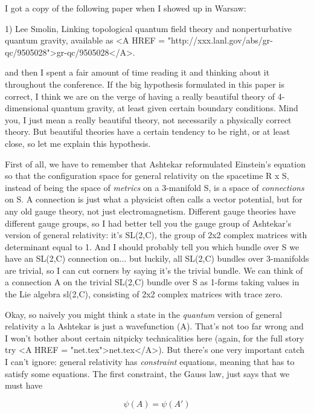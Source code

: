

I got a copy of the following paper when I showed up in Warsaw:

1) Lee Smolin, Linking topological quantum field theory and 
nonperturbative quantum gravity, available as <A HREF = "http://xxx.lanl.gov/abs/gr-qc/9505028">gr-qc/9505028</A>.

and then I spent a fair amount of time reading it and thinking
about it throughout the conference.  If the big hypothesis formulated in
this paper is correct, I think we are on the verge of having a
really beautiful theory of 4-dimensional quantum gravity, at
least given certain boundary conditions.  Mind you, I just
mean a really beautiful theory, not necessarily a physically
correct theory.  But beautiful theories have a certain tendency
to be right, or at least close, so let me explain this hypothesis. 

First of all, we have to remember that Ashtekar reformulated
Einstein's equation so that the configuration space for general 
relativity on the spacetime R x S, instead of being the space
of \emph{metrics} on a 3-manifold S, is a space of \emph{connections} on S.  
A connection is just what a physicist often calls a vector potential, but
for any old gauge theory, not just electromagnetism.  Different gauge
theories have different gauge groups, so I had better tell you the
gauge group of Ashtekar's version of general relativity: it's SL(2,C), 
the group of 2x2 complex matrices with determinant equal to 1. 
And I should probably tell you which bundle over S we have an SL(2,C)
connection on... but luckily, all SL(2,C) bundles over 3-manifolds
are trivial, so I can cut corners by saying it's the trivial bundle. 
We can think of a connection A
on the trivial SL(2,C) bundle over S as 1-forms taking values in
the Lie algebra sl(2,C), consisting of 2x2 complex matrices with
trace zero.

Okay, so naively you might think a state in the \emph{quantum} version
of general relativity a la Ashtekar is just a wavefunction \psi (A).
That's not too far wrong and I won't bother about certain nitpicky
technicalities here (again, for the full story try 
<A HREF = "net.tex">net.tex</A>).  But there's
one very important catch I can't ignore: general relativity has 
\emph{constraint} equations, meaning that \psi  has to satisfy some 
equations.  The first constraint, the Gauss law, just says that we must have

$$
                      \psi (A) = \psi (A')
$$
    

